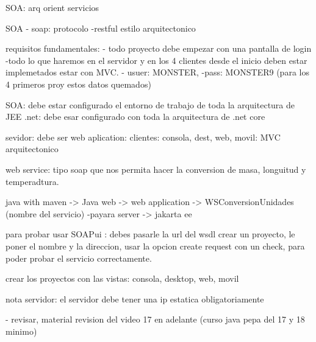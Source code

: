 SOA: arq orient servicios

SOA 
- soap: protocolo
-restful estilo arquitectonico

requisitos fundamentales:
- todo proyecto debe empezar con una pantalla de login 
-todo lo que haremos en el servidor y en los 4 clientes desde el inicio deben estar implemetados estar con MVC.
- usuer: MONSTER, -pass: MONSTER9 (para los 4 primeros proy estos datos quemados)



SOA: debe estar configurado el entorno de trabajo de toda la arquitectura de JEE
.net: debe esar configurado con toda la arquitectura de .net core

sevidor: debe ser web aplication:
clientes: consola, dest, web, movil: MVC arquitectonico 

web service: tipo soap que nos permita hacer la conversion de masa, longuitud y temperadtura. 

java with maven -> Java web -> web application -> WSConversionUnidades (nombre del servicio) -payara server -> jakarta ee

para probar usar SOAPui : debes pasarle la url del wsdl crear un proyecto, le poner el nombre y la direccion, usar la opcion create request con un check,
para poder probar el servicio correctamente. 


crear los proyectos con las vistas:
consola, desktop, web, movil

nota
servidor: el servidor debe tener una ip estatica obligatoriamente 



- revisar, material revision del video 17 en adelante (curso java pepa del 17 y 18 minimo)

